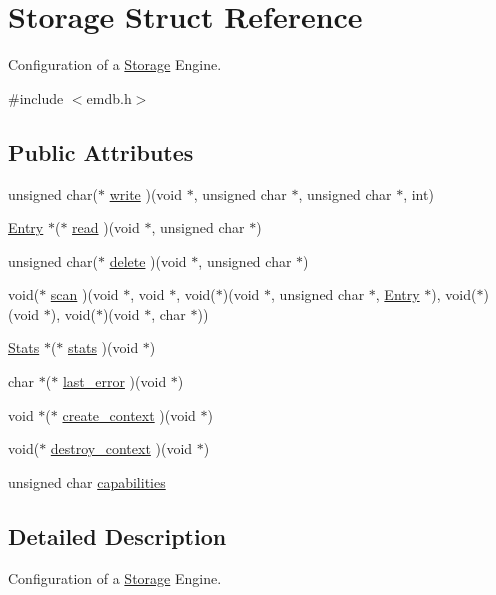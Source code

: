 \hypertarget{struct_storage}{}\section{Storage Struct Reference}
\label{struct_storage}


Configuration of a \hyperlink{struct_storage}{Storage} Engine.  




{\ttfamily \#include $<$emdb.\+h$>$}

\subsection*{Public Attributes}
\begin{DoxyCompactItemize}
\item 
unsigned char($\ast$ \hyperlink{struct_storage_a277c5f5a2ec42f4b66e83a95fb2b679c}{write} )(void $\ast$, unsigned char $\ast$, unsigned char $\ast$, int)
\item 
\hyperlink{struct_entry}{Entry} $\ast$($\ast$ \hyperlink{struct_storage_a6f8774ce9a6598367d47eaeafaf245d4}{read} )(void $\ast$, unsigned char $\ast$)
\item 
unsigned char($\ast$ \hyperlink{struct_storage_ae33c4c6b8e7dda3a854c3754ecbd22d9}{delete} )(void $\ast$, unsigned char $\ast$)
\item 
void($\ast$ \hyperlink{struct_storage_ae2c0ea6705b1e1b3518f97b60581a9e3}{scan} )(void $\ast$, void $\ast$, void($\ast$)(void $\ast$, unsigned char $\ast$, \hyperlink{struct_entry}{Entry} $\ast$), void($\ast$)(void $\ast$), void($\ast$)(void $\ast$, char $\ast$))
\item 
\hyperlink{struct_stats}{Stats} $\ast$($\ast$ \hyperlink{struct_storage_a6642751e068c1e64f8b65703a8bc51a0}{stats} )(void $\ast$)
\item 
char $\ast$($\ast$ \hyperlink{struct_storage_a32909539bbc234d20b4bb0a51c575c9c}{last\+\_\+error} )(void $\ast$)
\item 
void $\ast$($\ast$ \hyperlink{struct_storage_a96d6e9b9bfd5b4943eb9660ca2293447}{create\+\_\+context} )(void $\ast$)
\item 
void($\ast$ \hyperlink{struct_storage_af425b1971a9fcfed315e6aec547df8da}{destroy\+\_\+context} )(void $\ast$)
\item 
unsigned char \hyperlink{struct_storage_a0317c04d73bd91a5a71311d429d2c463}{capabilities}
\end{DoxyCompactItemize}


\subsection{Detailed Description}
Configuration of a \hyperlink{struct_storage}{Storage} Engine. 

